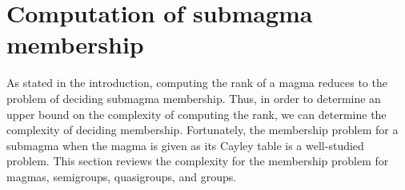 \documentclass{article}
\newcommand{\todo}[1]{\textbf{TODO #1}}
\DeclareMathOperator{\Cay}{Cay}
\begin{document}




\section{Computation of submagma membership}
%
As stated in the introduction, computing the rank of a magma reduces to the problem of deciding submagma membership.
Thus, in order to determine an upper bound on the complexity of computing the rank, we can determine the complexity of deciding membership.
%
Fortunately, the membership problem for a submagma when the magma is given as its Cayley table is a well-studied problem.
This section reviews the complexity for the membership problem for magmas, semigroups, quasigroups, and groups.
\end{document}
